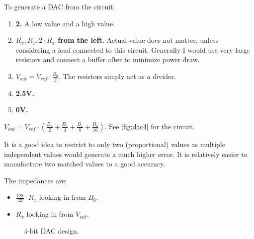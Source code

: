 
\begin{arabicparts}
    \questionpart To generate a DAC from the circuit:
    \begin{enumerate}
        \item \textbf{2.} A low value and a high value.
        \item \textbf{$R_x, R_x, 2 \cdot R_x$ from the left.} Actual value
                does not matter, unless considering a load connected to this circuit.
                Generally I would use very large resistors and connect a buffer after 
                to minimize power draw.
        \item \textbf{$V_{out} = V_{ref} \cdot \frac{B_0}{2}.$} The resistors simply act as a divider.
        \item \textbf{2.5V.}
        \item \textbf{0V.}
    \end{enumerate}

    \questionpart
    \textbf{$V_{out} = V_{ref} \cdot \left( \frac{B_3}{2} +
            \frac{B_2}{4} + \frac{B_1}{8} + \frac{B_0}{16}\right).$} See \autoref{fig:dac4}
            for the circuit.

            It is a good idea to restrict to only two (proportional) values as multiple independent
            values would generate a much higher error. It is relatively easier to manufacture two
            matched values to a good accuracy.

            The impedances are:
            \begin{itemize}
                \item \textbf{$\frac{128}{43} \cdot R_x$} looking in from $B_0$.
                \item \textbf{$R_x$} looking in from $V_{out}$.
            \end{itemize}
    
    \begin{figure}[ht]
        \centering
        \scalebox{0.75}{}
        \caption{4-bit DAC design.}
        \label{fig:dac4}
    \end{figure}

\end{arabicparts}